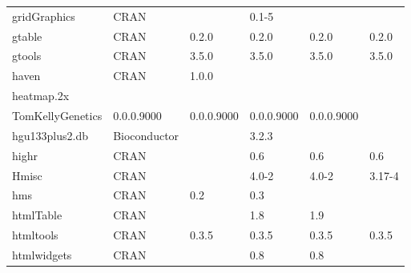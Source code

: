 \begin{longtable}{llllll}
\rowcolor{black!5}
gridGraphics                  & \acrshort{CRAN}                      &             & 0.1-5       &                &                    \\
\rowcolor{black!10}
gtable                        & \acrshort{CRAN}                      & 0.2.0       & 0.2.0       & 0.2.0          & 0.2.0             \\
\rowcolor{black!5}
gtools                        & \acrshort{CRAN}                      & 3.5.0       & 3.5.0       & 3.5.0          & 3.5.0              \\
\rowcolor{black!10}
haven                         & \acrshort{CRAN}                      & 1.0.0       &             &                &                   \\
\rowcolor{black!5}
heatmap.2x                    & \begin{tabular}[c]{@{}l@{}}GitHub \\ TomKellyGenetics \end{tabular}  & 0.0.0.9000  & 0.0.0.9000  & 0.0.0.9000     & 0.0.0.9000         \\
\rowcolor{black!10}
hgu133plus2.db                & Bioconductor              &             & 3.2.3       &                &                   \\
\rowcolor{black!5}
highr                         & \acrshort{CRAN}                      &             & 0.6         & 0.6            & 0.6                \\
\rowcolor{black!10}
Hmisc                         & \acrshort{CRAN}                      &             & 4.0-2       & 4.0-2          & 3.17-4            \\
\rowcolor{black!5}
hms                           & \acrshort{CRAN}                      & 0.2         & 0.3         &                &                    \\
\rowcolor{black!10}
htmlTable                     & \acrshort{CRAN}                      &             & 1.8         & 1.9            &                   \\
\rowcolor{black!5}
htmltools                     & \acrshort{CRAN}                      & 0.3.5       & 0.3.5       & 0.3.5          & 0.3.5              \\
\rowcolor{black!10}
htmlwidgets                   & \acrshort{CRAN}                      &             & 0.8         & 0.8            &                   \\

\end{longtable}
